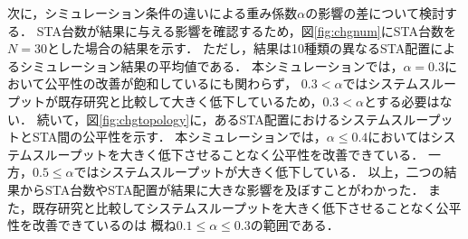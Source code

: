 \documentclass[master]{kuisthesis}		%
\begin{document}
			次に，シミュレーション条件の違いによる重み係数$\alpha$の影響の差について検討する．
			STA台数が結果に与える影響を確認するため，図\ref{fig:chgnum}にSTA台数を$N=30$とした場合の結果を示す．
			ただし，結果は10種類の異なるSTA配置によるシミュレーション結果の平均値である．
			本シミュレーションでは，$\alpha=0.3$において公平性の改善が飽和しているにも関わらず，
			$0.3<\alpha$ではシステムスループットが既存研究と比較して大きく低下しているため，$0.3<\alpha$とする必要はない．
			続いて，図\ref{fig:chgtopology}に，あるSTA配置におけるシステムスループットとSTA間の公平性を示す．
			本シミュレーションでは，$\alpha\leq0.4$においてはシステムスループットを大きく低下させることなく公平性を改善できている．
			一方，$0.5\leq\alpha$ではシステムスループットが大きく低下している．
			以上，二つの結果からSTA台数やSTA配置が結果に大きな影響を及ぼすことがわかった．
			また，既存研究と比較してシステムスループットを大きく低下させることなく公平性を改善できているのは
			概ね$0.1\leq\alpha\leq0.3$の範囲である．
\end{document}
